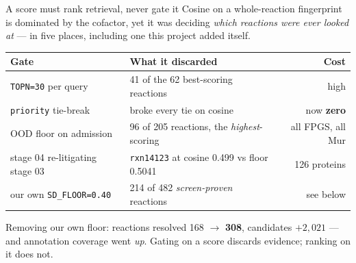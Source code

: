 \documentclass[aspectratio=169,10pt]{beamer}
\newcommand{\good}[1]{{\color{cGood}\textbf{#1}}}
\newcommand{\bad}[1]{{\color{cBad}#1}}
\newcommand{\takeaway}[1]{\vfill\begin{tcolorbox}[colback=structure!12!white,
  colframe=structure!60!black,boxrule=0.4pt,left=5pt,right=5pt,top=3pt,bottom=3pt]
  \small #1\end{tcolorbox}}
\begin{document}
\begin{frame}{A score must rank retrieval, never gate it}
  Cosine on a whole-reaction fingerprint is dominated by the cofactor, yet it
  was deciding \emph{which reactions were ever looked at} --- in five places,
  including one this project added itself.

  \smallskip
  \centering\footnotesize
  \begin{tabular}{llr}
    \toprule
    \textbf{Gate} & \textbf{What it discarded} & \textbf{Cost} \\
    \midrule
    \texttt{TOPN=30} per query      & 41 of the 62 best-scoring reactions & \bad{high} \\
    \texttt{priority} tie-break     & broke every tie on cosine & now \good{zero} \\
    OOD floor on admission          & 96 of 205 reactions, the \emph{highest}-scoring & all FPGS, all Mur \\
    stage 04 re-litigating stage 03 & \texttt{rxn14123} at cosine 0.499 vs floor 0.5041 & 126 proteins \\
    \bad{our own} \texttt{SD\_FLOOR=0.40} & 214 of 482 \emph{screen-proven} reactions & see below \\
    \bottomrule
  \end{tabular}

  \takeaway{Removing our own floor: reactions resolved 168 $\rightarrow$
  \good{308}, candidates $+2{,}021$ --- and annotation coverage went \emph{up}.
  Gating on a score discards evidence; ranking on it does not.}
\end{frame}
\end{document}
